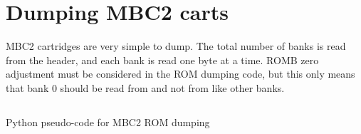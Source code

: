 \documentclass[\main/gbctr.tex]{subfiles}
\begin{document}
\section{Dumping MBC2 carts}

MBC2 cartridges are very simple to dump. The total number of banks is read from
the header, and each bank is read one byte at a time. ROMB zero adjustment must
be considered in the ROM dumping code, but this only means that bank 0 should
be read from  and not from  like
other banks.

\begin{listing}[H]
  \inputminted[frame=lines]{python}{code-snippets/mbc2_rom_dump.py}
  \caption{Python pseudo-code for MBC2 ROM dumping}
\end{listing}
\end{document}
